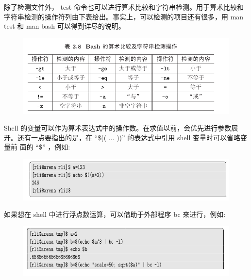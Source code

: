 \documentclass[12pt，a4paper]{article}
\numberwithin{equation}{section}
\begin{document}
除了检测文件外， test 命令也可以进行算术比较和字符串检测。用于算术比较和字符串检测的操作符列由下表给出。事实上，可以检测的项目还有很多，用 man test 和 man bash 可以得到详尽的说明。
\begin{figure}[H]
\centering
\includegraphics[scale=0.6]{./figures/275.png}
\end{figure}
Shell 的变量可以作为算术表达式中的操作数。在求值以前，会优先进行参数展开。还有一点要指出的是，在 “\$(( ... ))” 的表达式中引用 shell 变量时可以省略变量前
面的 “\$” ，例如:
\begin{figure}[H]
\centering
\includegraphics[scale=0.6]{./figures/276.png}
\end{figure}
如果想在 shell 中进行浮点数运算，可以借助于外部程序 bc 来进行，例如:

\begin{figure}[H]
\centering
\includegraphics[scale=0.6]{./figures/263.png}
\end{figure}
\end{document}
